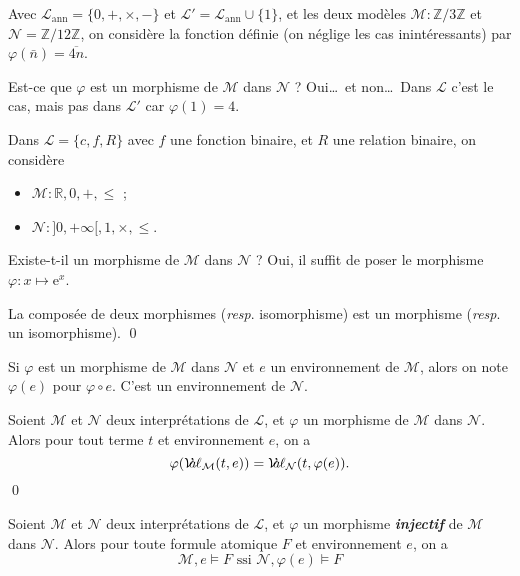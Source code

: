 \documentclass[./main]{subfiles}
\begin{document}
  \begin{exm}
    Avec $\mathcal{L}_\mathrm{ann} = \{0, +, \times ,-\}$ et $\mathcal{L}' = \mathcal{L}_\mathrm{ann}\cup  \{1\}$, et les deux modèles $\mathcal{M} : \mathds{Z} / 3\mathds{Z}$ et $\mathcal{N} = \mathds{Z} / 12 \mathds{Z}$, on considère la fonction définie (on néglige les cas inintéressants) par $\varphi(\bar{n}) = \overline{4n}$.

    Est-ce que $\varphi$ est un morphisme de $\mathcal{M}$ dans $\mathcal{N}$ ? Oui\ldots\ et non\ldots\ Dans $\mathcal{L}$ c'est le cas, mais pas dans $\mathcal{L}'$  car $\varphi(1) = 4$.
  \end{exm}

  \begin{exm}
    Dans $\mathcal{L} = \{c, f, R\}$ avec $f$ une fonction binaire, et $R$ une relation binaire, on considère 
    \begin{itemize}
      \item $\mathcal{M} : \mathds{R}, 0, +, \le$ ;
      \item $\mathcal{N} : {]{0,+\infty}[}, 1, \times , \le$.
    \end{itemize}
    Existe-t-il un morphisme de $\mathcal{M}$ dans $\mathcal{N}$ ?
    Oui, il suffit de poser le morphisme $\varphi : x \mapsto \mathrm{e}^x$.
  \end{exm}

  \begin{prop}
    La composée de deux morphismes (\textit{resp}. isomorphisme) est un morphisme (\textit{resp}. un isomorphisme).
    \qed
  \end{prop}

  \begin{nota}
    Si $\varphi$ est un morphisme de $\mathcal{M}$ dans $\mathcal{N}$ et $e$ un environnement de $\mathcal{M}$,
    alors on note $\varphi(e)$ pour  $\varphi \circ e$. C'est un environnement de $\mathcal{N}$.
  \end{nota}

  \begin{lem}
    Soient $\mathcal{M}$ et $\mathcal{N}$ deux interprétations de $\mathcal{L}$, et $\varphi$ un morphisme de $\mathcal{M}$ dans $\mathcal{N}$. Alors pour tout terme $t$ et environnement $e$, on a \[
    \varphi(\mathcal{V}\hspace{-3.5pt}a\hspace{-0.5pt}\ell_{\mathcal{M}}(t, e)) = \mathcal{V}\hspace{-3.5pt}a\hspace{-0.5pt}\ell_{\mathcal{N}}(t, \varphi(e))
    .\]
    \qed
  \end{lem}

  \begin{lem}
    Soient $\mathcal{M}$ et $\mathcal{N}$ deux interprétations de $\mathcal{L}$, et $\varphi$ un morphisme \textit{\textbf{injectif}} de $\mathcal{M}$ dans $\mathcal{N}$. Alors pour toute formule atomique $F$ et environnement $e$, on a \[
      \mathcal{M}, e \models F \text{ ssi } \mathcal{N}, \varphi(e) \models F
    \]
  \end{lem}
\end{document}
